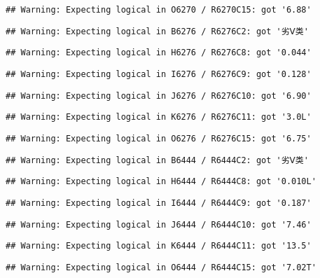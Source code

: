\documentclass[
]{article}
\begin{document}
\begin{verbatim}
## Warning: Expecting logical in O6270 / R6270C15: got '6.88'
\end{verbatim}

\begin{verbatim}
## Warning: Expecting logical in B6276 / R6276C2: got '劣Ⅴ类'
\end{verbatim}

\begin{verbatim}
## Warning: Expecting logical in H6276 / R6276C8: got '0.044'
\end{verbatim}

\begin{verbatim}
## Warning: Expecting logical in I6276 / R6276C9: got '0.128'
\end{verbatim}

\begin{verbatim}
## Warning: Expecting logical in J6276 / R6276C10: got '6.90'
\end{verbatim}

\begin{verbatim}
## Warning: Expecting logical in K6276 / R6276C11: got '3.0L'
\end{verbatim}

\begin{verbatim}
## Warning: Expecting logical in O6276 / R6276C15: got '6.75'
\end{verbatim}

\begin{verbatim}
## Warning: Expecting logical in B6444 / R6444C2: got '劣Ⅴ类'
\end{verbatim}

\begin{verbatim}
## Warning: Expecting logical in H6444 / R6444C8: got '0.010L'
\end{verbatim}

\begin{verbatim}
## Warning: Expecting logical in I6444 / R6444C9: got '0.187'
\end{verbatim}

\begin{verbatim}
## Warning: Expecting logical in J6444 / R6444C10: got '7.46'
\end{verbatim}

\begin{verbatim}
## Warning: Expecting logical in K6444 / R6444C11: got '13.5'
\end{verbatim}

\begin{verbatim}
## Warning: Expecting logical in O6444 / R6444C15: got '7.02T'
\end{verbatim}
\end{document}
